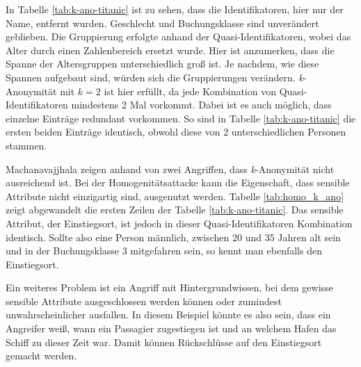 In Tabelle \ref{tab:k-ano-titanic} ist zu sehen, dass die Identifikatoren, hier nur der Name, entfernt wurden.
Geschlecht und Buchungsklasse sind unverändert geblieben.
Die Gruppierung erfolgte anhand der Quasi-Identifikatoren, wobei das Alter durch einen Zahlenbereich ersetzt wurde.
Hier ist anzumerken, dass die Spanne der Altersgruppen unterschiedlich groß ist. 
Je nachdem, wie diese Spannen aufgebaut sind, würden sich die Gruppierungen verändern.
\textit{k}-Anonymität mit $k = 2$ ist hier erfüllt, da jede Kombination von Quasi-Identifikatoren mindestens 2 Mal vorkommt.
Dabei ist es auch möglich, dass einzelne Einträge redundant vorkommen. 
So sind in Tabelle \ref{tab:k-ano-titanic} die ersten beiden Einträge identisch, obwohl diese von 2 unterschiedlichen Personen stammen.

Machanavajjhala \etal \cite{P-24} zeigen anhand von zwei Angriffen, dass \textit{k}-Anonymität nicht ausreichend ist.
Bei der Homogenitätsattacke kann die Eigenschaft, dass sensible Attribute nicht einzigartig sind, ausgenutzt werden.
Tabelle \ref{tab:homo_k_ano} zeigt abgewandelt die ersten Zeilen der Tabelle \ref{tab:k-ano-titanic}.
Das sensible Attribut, der Einstiegsort, ist jedoch in dieser Quasi-Identifikatoren Kombination identisch.
Sollte also eine Person männlich, zwischen 20 und 35 Jahren alt sein und in der Buchungsklasse 3 mitgefahren sein, so kennt man ebenfalls den Einstiegsort.


Ein weiteres Problem ist ein Angriff mit Hintergrundwissen, bei dem gewisse sensible Attribute ausgeschlossen werden können oder zumindest unwahrscheinlicher ausfallen.
In diesem Beispiel könnte es also sein, dass ein Angreifer weiß, wann ein Passagier zugestiegen ist und an welchem Hafen das Schiff zu dieser Zeit war. 
Damit können Rückschlüsse auf den Einstiegsort gemacht werden.

